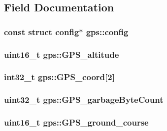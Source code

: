 \subsection{Field Documentation}
\hypertarget{structgps_a5a3a1380775087b5c95a854e72efd167}{
\subsubsection[{config}]{\setlength{\rightskip}{0pt plus 5cm}const struct {\bf config}$\ast$ gps\+::config}}\label{structgps_a5a3a1380775087b5c95a854e72efd167}
\hypertarget{structgps_a6e61c7cefd9bf03f800785393686140a}{
\subsubsection[{G\+P\+S\+\_\+altitude}]{\setlength{\rightskip}{0pt plus 5cm}uint16\+\_\+t gps\+::\+G\+P\+S\+\_\+altitude}}\label{structgps_a6e61c7cefd9bf03f800785393686140a}
\hypertarget{structgps_ab71d92d4bd48f6caf45341214387c62c}{
\subsubsection[{G\+P\+S\+\_\+coord}]{\setlength{\rightskip}{0pt plus 5cm}int32\+\_\+t gps\+::\+G\+P\+S\+\_\+coord\mbox{[}2\mbox{]}}}\label{structgps_ab71d92d4bd48f6caf45341214387c62c}
\hypertarget{structgps_a21619a61364bab3abe1e5c793c92cb4b}{
\subsubsection[{G\+P\+S\+\_\+garbage\+Byte\+Count}]{\setlength{\rightskip}{0pt plus 5cm}uint32\+\_\+t gps\+::\+G\+P\+S\+\_\+garbage\+Byte\+Count}}\label{structgps_a21619a61364bab3abe1e5c793c92cb4b}
\hypertarget{structgps_ae3f9e8d2bbd8f37022f85b543c06dbb8}{
\subsubsection[{G\+P\+S\+\_\+ground\+\_\+course}]{\setlength{\rightskip}{0pt plus 5cm}uint16\+\_\+t gps\+::\+G\+P\+S\+\_\+ground\+\_\+course}}\label{structgps_ae3f9e8d2bbd8f37022f85b543c06dbb8}
